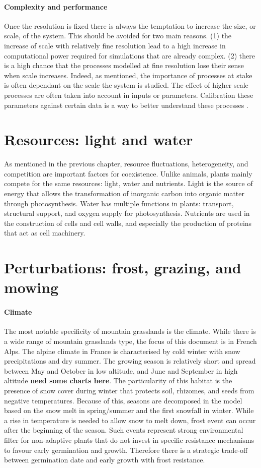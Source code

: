 \paragraph{Complexity and performance}
Once the resolution is fixed there is always the temptation to increase the size, or scale, of the system. This should be avoided for two main reasons. (1) the increase of scale with relatively fine resolution lead to a high increase in computational power required for simulations that are already complex. (2) there is a high chance that the processes modelled at fine resolution lose their sense when scale increases. Indeed, as mentioned, the importance of processes at stake is often dependant on the scale the system is studied. The effect of higher scale processes are often taken into account in inputs or parameters\cite{}. Calibration these parameters against certain data is a way to better understand these processes \cite{lagarigues}. 

\section{Resources: light and water}
As mentioned in the previous chapter, resource fluctuations, heterogeneity, and competition are important factors for coexistence. Unlike animals, plants mainly compete for the same resources: light, water and nutrients. Light is the source of energy that allows the transformation of inorganic carbon into organic matter through photosynthesis. Water has multiple functions in plants: transport, structural support, and oxygen supply for photosynthesis. Nutrients are used in the construction of cells and cell walls, and especially the production of proteins that act as cell machinery.

\section{Perturbations: frost, grazing, and mowing}
\paragraph{Climate}
The most notable specificity of mountain grasslands is the climate. While there is a wide range of mountain grasslands type, the focus of this document is in French Alps. The alpine climate in France is characterised by cold winter with snow precipitations and dry summer. The growing season is relatively short and spread between May and October in low altitude, and June and September in high altitude \textbf{need some charts here}. The particularity of this habitat is the presence of snow cover during winter that protects soil, rhizomes, and seeds from negative temperatures. Because of this, seasons are decomposed in the model based on the snow melt in spring/summer and the first snowfall in winter. While a rise in temperature is needed to allow snow to melt down, frost event can occur after the beginning of the season. Such events represent strong environmental filter for non-adaptive plants that do not invest in specific resistance mechanisms to favour early germination and growth. Therefore there is a strategic trade-off between germination date and early growth with frost resistance.

